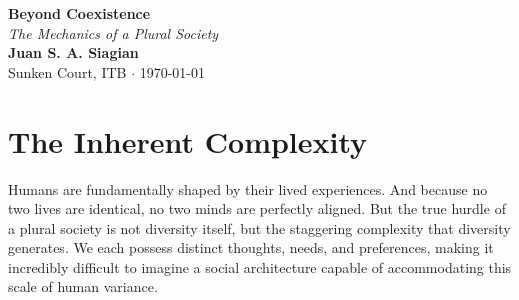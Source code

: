 \documentclass[11pt,a4paper]{article}
\begin{document}
\begin{center}
    \vspace*{2em}
    {\Huge \textbf{Beyond Coexistence}}\\[0.5em]
    {\Large \textit{The Mechanics of a Plural Society}}\\[2em]

    {\large \textbf{Juan S. A. Siagian}}\\[0.5em]
    {\normalsize Sunken Court, ITB \hspace{0.5em} $\cdot$ \hspace{0.5em} \today}\\[3em]
\end{center}

\section*{The Inherent Complexity}
Humans are fundamentally shaped by their lived experiences. And because no two lives are identical, no two minds are perfectly aligned. But the true hurdle of a plural society is not diversity itself, but the staggering complexity that diversity generates. We each possess distinct thoughts, needs, and preferences, making it incredibly difficult to imagine a social architecture capable of accommodating this scale of human variance.
\end{document}
